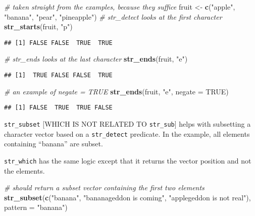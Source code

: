 \documentclass[
]{book}
\newenvironment{Shaded}{}{}
\newcommand{\CommentTok}[1]{\textcolor[rgb]{0.38,0.63,0.69}{\textit{#1}}}
\newcommand{\DataTypeTok}[1]{\textcolor[rgb]{0.56,0.13,0.00}{#1}}
\newcommand{\KeywordTok}[1]{\textcolor[rgb]{0.00,0.44,0.13}{\textbf{#1}}}
\newcommand{\NormalTok}[1]{#1}
\newcommand{\OtherTok}[1]{\textcolor[rgb]{0.00,0.44,0.13}{#1}}
\newcommand{\StringTok}[1]{\textcolor[rgb]{0.25,0.44,0.63}{#1}}
\begin{document}
\begin{Shaded}
\begin{Highlighting}[]
\CommentTok{# taken straight from the examples, because they suffice}
\NormalTok{fruit <-}\StringTok{ }\KeywordTok{c}\NormalTok{(}\StringTok{"apple"}\NormalTok{, }\StringTok{"banana"}\NormalTok{, }\StringTok{"pear"}\NormalTok{, }\StringTok{"pineapple"}\NormalTok{)}
\CommentTok{# str_detect looks at the first character}
\KeywordTok{str_starts}\NormalTok{(fruit, }\StringTok{"p"}\NormalTok{)}
\end{Highlighting}
\end{Shaded}

\begin{verbatim}
## [1] FALSE FALSE  TRUE  TRUE
\end{verbatim}

\begin{Shaded}
\begin{Highlighting}[]
\CommentTok{# str_ends looks at the last character}
\KeywordTok{str_ends}\NormalTok{(fruit, }\StringTok{"e"}\NormalTok{)}
\end{Highlighting}
\end{Shaded}

\begin{verbatim}
## [1]  TRUE FALSE FALSE  TRUE
\end{verbatim}

\begin{Shaded}
\begin{Highlighting}[]
\CommentTok{# an example of negate = TRUE}
\KeywordTok{str_ends}\NormalTok{(fruit, }\StringTok{"e"}\NormalTok{, }\DataTypeTok{negate =} \OtherTok{TRUE}\NormalTok{)}
\end{Highlighting}
\end{Shaded}

\begin{verbatim}
## [1] FALSE  TRUE  TRUE FALSE
\end{verbatim}

\texttt{str\_subset} {[}WHICH IS NOT RELATED TO \texttt{str\_sub}{]} helps with subsetting a character vector based on a \texttt{str\_detect} predicate.
In the example, all elements containing ``banana'' are subset.

\texttt{str\_which} has the same logic except that it returns the vector position and not the elements.

\begin{Shaded}
\begin{Highlighting}[]
\CommentTok{# should return a subset vector containing the first two elements}
\KeywordTok{str_subset}\NormalTok{(}\KeywordTok{c}\NormalTok{(}\StringTok{"banana"}\NormalTok{,}
             \StringTok{"bananageddon is coming"}\NormalTok{,}
             \StringTok{"applegeddon is not real"}\NormalTok{),}
           \DataTypeTok{pattern =} \StringTok{"banana"}\NormalTok{)}
\end{Highlighting}
\end{Shaded}
\end{document}
